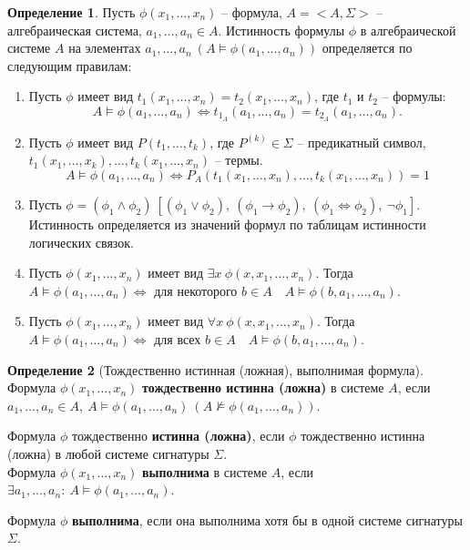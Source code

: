 \documentclass{report}
\theoremstyle{definition}
\newtheorem{definition}{Определение}[section]
\begin{document}
\begin{definition}
    Пусть $\phi(x_1,\ldots,x_n)$ -- формула, $A = <A,\Sigma>$ -- алгебраическая система, $a_1,\ldots,a_n \in A$. Истинность формулы $\phi$ в алгебраической системе $A$ на элементах $a_1,\ldots,a_n \ (A \vDash \phi(a_1,\ldots,a_n))$ определяется по следующим правилам:
    \begin{enumerate}
        \item Пусть $\phi$ имеет вид $t_1(x_1,\ldots,x_n) = t_2(x_1,\ldots,x_n)$, где $t_1$ и $t_2$ -- формулы:
              \begin{equation*}
                  A \vDash \phi(a_1,\ldots,a_n) \iff t_{1_A}(a_1,\ldots,a_n) = t_{2_A}(a_1,\ldots,a_n).
              \end{equation*}
        \item Пусть $\phi$ имеет вид $P(t_1,\ldots, t_k)$, где $P^{(k)}\in \Sigma$ -- предикатный символ, $t_1(x_1,\ldots,x_k),\ldots,t_k(x_1,\ldots,x_n)$ -- термы.
              \begin{equation*}
                  A\vDash \phi(a_1,\ldots,a_n) \iff P_A(t_1(x_1,\ldots,x_n),\ldots,t_k(x_1,\ldots,x_n)) = 1
              \end{equation*}
        \item Пусть $\phi = (\phi_1 \land \phi_2) \ [(\phi_1 \lor \phi_2), \ (\phi_1 \rightarrow \phi_2), \ (\phi_1 \iff \phi_2), \ \lnot \phi_1]$. Истинность определяется из значений формул по таблицам истинности логических связок.
        \item Пусть $\phi(x_1,\ldots,x_n)$ имеет вид $\exists x \ \phi(x,x_1,\ldots,x_n)$. Тогда $A\vDash \phi(a_1,\ldots,a_n) \iff$ для некоторого $b\in A \quad A\vDash \phi(b,a_1,\ldots,a_n)$.
        \item Пусть $\phi(x_1,\ldots,x_n)$ имеет вид $\forall x \ \phi(x,x_1,\ldots,x_n)$. Тогда $A\vDash\phi(a_1,\ldots,a_n) \iff$ для всех $b\in A \quad A\vDash\phi(b,a_1,\ldots,a_n)$.
    \end{enumerate}
\end{definition}

\begin{definition}[Тождественно истинная (ложная), выполнимая формула]
    Формула $\phi(x_1,\ldots,x_n)$ \textbf{тождественно истинна (ложна)} в системе $A$, если $a_1,\ldots,a_n \in A, \ A \vDash \phi(a_1,\ldots,a_n) \ (A\nvDash \phi(a_1,\ldots,a_n))$.

    Формула $\phi$ тождественно \textbf{истинна (ложна)}, если $\phi$ тождественно истинна (ложна) в любой системе сигнатуры $\Sigma$. \\

    Формула $\phi(x_1,\ldots,x_n)$ \textbf{выполнима} в системе $A$, если $\exists a_1,\ldots,a_n: \ A\vDash\phi(a_1,\ldots,a_n)$.

    Формула $\phi$ \textbf{выполнима}, если она выполнима хотя бы в одной системе сигнатуры $\Sigma$.
\end{definition}
\end{document}
